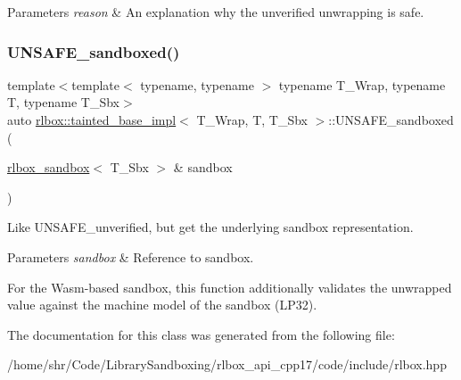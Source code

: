 \begin{DoxyParams}{Parameters}
{\em reason} & An explanation why the unverified unwrapping is safe. \\
\hline
\end{DoxyParams}
\mbox{\label{classrlbox_1_1tainted__base__impl_ae2c69129cbb9344e7d2623129f031214}} 
\subsubsection{\texorpdfstring{U\+N\+S\+A\+F\+E\+\_\+sandboxed()}{UNSAFE\_sandboxed()}}
{\footnotesize\ttfamily template$<$template$<$ typename, typename $>$ typename T\+\_\+\+Wrap, typename T, typename T\+\_\+\+Sbx$>$ \\
auto \hyperlink{classrlbox_1_1tainted__base__impl}{rlbox\+::tainted\+\_\+base\+\_\+impl}$<$ T\+\_\+\+Wrap, T, T\+\_\+\+Sbx $>$\+::U\+N\+S\+A\+F\+E\+\_\+sandboxed (\begin{DoxyParamCaption}\item[{\hyperlink{classrlbox_1_1rlbox__sandbox}{rlbox\+\_\+sandbox}$<$ T\+\_\+\+Sbx $>$ \&}]{sandbox }\end{DoxyParamCaption})\hspace{0.3cm}{\ttfamily [inline]}}



Like U\+N\+S\+A\+F\+E\+\_\+unverified, but get the underlying sandbox representation. 


\begin{DoxyParams}{Parameters}
{\em sandbox} & Reference to sandbox.\\
\hline
\end{DoxyParams}
For the Wasm-\/based sandbox, this function additionally validates the unwrapped value against the machine model of the sandbox (L\+P32). 

The documentation for this class was generated from the following file\+:\begin{DoxyCompactItemize}
\item 
/home/shr/\+Code/\+Library\+Sandboxing/rlbox\+\_\+api\+\_\+cpp17/code/include/rlbox.\+hpp\end{DoxyCompactItemize}

